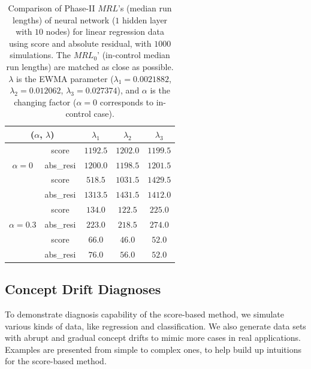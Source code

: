 \documentclass[twoside,11pt]{article}
\begin{document}
\begin{table}[!t]
\centering
\begin{tabular}{ccccc}
\toprule
\multicolumn{2}{c}{($ \alpha$, $ \lambda$)} & {$ \lambda_1$} & {$ \lambda_2$} & {$ \lambda_3$} \\
\midrule
\multirow{3}{*}{$\alpha=0$} & score &$1192.5$ & $1202.0$ & $1199.5$ \\
& abs\_resi &$1200.0$ & $1198.5$ & $1201.5$ \\
\midrule
\multirow{3}{*}{$\alpha=0.1$} & score &$\bm {518.5}$ & $\bm{1031.5}$ & $1429.5$ \\
& abs\_resi &$1313.5$ & $1431.5$ & $\bm{1412.0}$ \\
\midrule
\multirow{3}{*}{$\alpha=0.3$} & score &$\bm{134.0}$ & $\bm{122.5}$ & $\bm{225.0}$ \\
& abs\_resi &$223.0$ & $218.5$ & $274.0$ \\
\midrule
\multirow{3}{*}{$\alpha=0.5$} & score &$\bm{66.0}$ & $\bm{46.0}$ & ${52.0}$ \\
& abs\_resi &$76.0$ & $56.0$ & $52.0$ \\
\midrule
\end{tabular}
\caption{Comparison of Phase-II $MRL$'s (median run lengths) of neural network ($1$ hidden layer with $10$ nodes) for linear regression data using score and absolute residual, with $1000$ simulations. The $MRL_0$' (in-control median run lengths) are matched as close as possible. $ \lambda$ is the EWMA parameter ({$ \lambda_1=0.0021882$}, {$ \lambda_2=0.012062$}, {$ \lambda_3=0.027374$}), and $ \alpha$ is the changing factor ($ \alpha=0$ corresponds to in-control case).}
\label{tab:lin_nnet_MRL}
\end{table}

\subsection{Concept Drift Diagnoses}
\label{ss:cd_diag}
To demonstrate diagnosis capability of the score-based method, we simulate various kinds of data, like regression and classification. We also generate data sets with abrupt and gradual concept drifts to mimic more cases in real applications. Examples are presented from simple to complex ones, to help build up intuitions for the score-based method.
\end{document}
